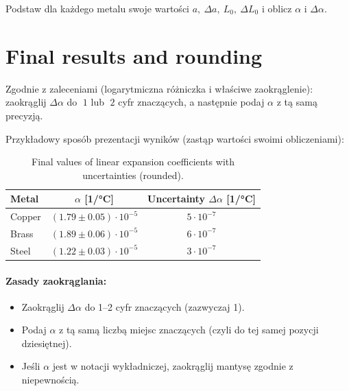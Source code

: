 \documentclass[a4paper,12pt]{article}
\begin{document}
Podstaw dla każdego metalu swoje wartości \(a,\ \Delta a,\ L_0,\ \Delta L_0\) i oblicz \(\alpha\) i \(\Delta\alpha\).

\section{Final results and rounding}

Zgodnie z zaleceniami (logarytmiczna różniczka i właściwe zaokrąglenie): zaokrąglij \(\Delta\alpha\) do \(\;1\) lub \(\;2\) cyfr znaczących, a następnie podaj \(\alpha\) z tą samą precyzją.

Przykładowy sposób prezentacji wyników (zastąp wartości swoimi obliczeniami):

\begin{table}[H]
\centering
\begin{tabular}{l c c}
\toprule
Metal & $\alpha$ [1/°C] & Uncertainty $\Delta\alpha$ [1/°C] \\
\midrule
Copper & \( (1.79 \pm 0.05)\cdot 10^{-5}\) & \(5\cdot10^{-7}\) \\
Brass  & \( (1.89 \pm 0.06)\cdot 10^{-5}\) & \(6\cdot10^{-7}\) \\
Steel  & \( (1.22 \pm 0.03)\cdot 10^{-5}\) & \(3\cdot10^{-7}\) \\
\bottomrule
\end{tabular}
\caption{Final values of linear expansion coefficients with uncertainties (rounded).}
\end{table}

\paragraph{Zasady zaokrąglania:}
\begin{itemize}
  \item Zaokrąglij \(\Delta\alpha\) do 1–2 cyfr znaczących (zazwyczaj 1).  
  \item Podaj \(\alpha\) z tą samą liczbą miejsc znaczących (czyli do tej samej pozycji dziesiętnej).
  \item Jeśli \(\alpha\) jest w notacji wykładniczej, zaokrąglij mantysę zgodnie z niepewnością.
\end{itemize}

\end{document}
